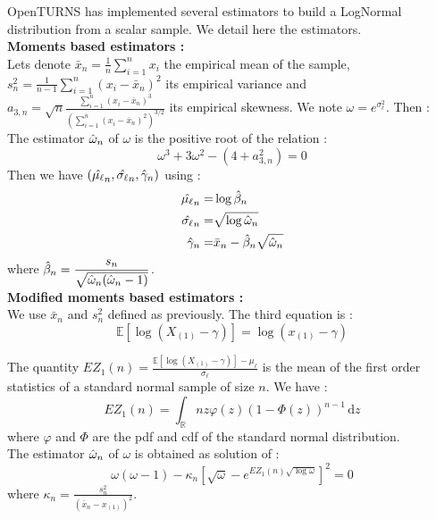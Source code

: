 OpenTURNS has implemented several estimators to build a LogNormal distribution from a scalar sample. We detail here the estimators.\\

{\bf Moments based estimators : }\\

Lets denote $\displaystyle \bar{x}_n = \frac{1}{n}\sum_{i=1}^nx_i$ the empirical mean of the sample, $\displaystyle s_n^2 = \frac{1}{n-1}\sum_{i=1}^n(x_i-\bar{x}_n)^2$ its empirical variance and $\displaystyle a_{3,n} =  \sqrt{n}\frac{\sum_{i=1}^n(x_i-\bar{x}_n)^3}{\left(\sum_{i=1}^n(x_i-\bar{x}_n)^2\right)^{3/2}}$ its empirical skewness.
We note $\omega=e^{\sigma_\ell^2}$. Then : \\

The estimator $\Hat{\omega}_n$ of  $\omega$ is the positive root of the relation :
\begin{equation}
\omega^3+3\omega^2-(4+a_{3,n}^2)=0
\end{equation}
Then we have $(\Hat{\mu_\ell}_n, \Hat{\sigma_\ell}_n, \Hat{\gamma}_n)$ using :
\begin{align}\label{estMom}
\Hat{\mu_\ell}_n = & \log \Hat{\beta}_n \nonumber \\
\Hat{\sigma_\ell}_n = & \sqrt{\log \Hat{\omega}_n}\nonumber \\
\Hat{\gamma}_n = & \bar{x}_n-\Hat{\beta}_n\sqrt{\Hat{\omega}_n}
\end{align}
where $\displaystyle \Hat{\beta}_n = \frac{s_n}{\sqrt{\Hat{\omega}_n(\Hat{\omega}_n-1)}}$.\\

{\bf Modified moments based estimators : }\\

We use $\displaystyle \bar{x}_n $ and $\displaystyle s_n^2 $ defined as previously. The third equation is :
\begin{equation}
\mathbb{E}[ \log(X_{(1)}-\gamma)] = \log (x_{(1)}-\gamma)
\end{equation}

The quantity $\displaystyle EZ_{1}(n) = \frac{\mathbb{E}[ \log(X_{(1)}-\gamma)]-\mu_\ell}{\sigma_\ell}$ is the mean of the first order statistics of a standard normal sample of size $n$. We have :
\begin{equation}
EZ_{1}(n) = \int_\mathbb{R} nz\varphi(z)(1-\Phi(z))^{n-1}\, \mathrm{d}z
\end{equation}
where $\varphi$ and $\Phi$ are the pdf and cdf of the standard normal distribution.\\
The estimator $\Hat{\omega}_n$ of $\omega$ is obtained as solution of :
\begin{equation}\label{ModMoments}
\omega(\omega-1)-\kappa_n\left[\sqrt{\omega}-e^{EZ_{1}(n)\sqrt{\log \omega}}\right]^2 = 0
\end{equation}
where $\kappa_n = \frac{s_n^2}{( \bar{x}_n-x_{(1)})^2}$.

